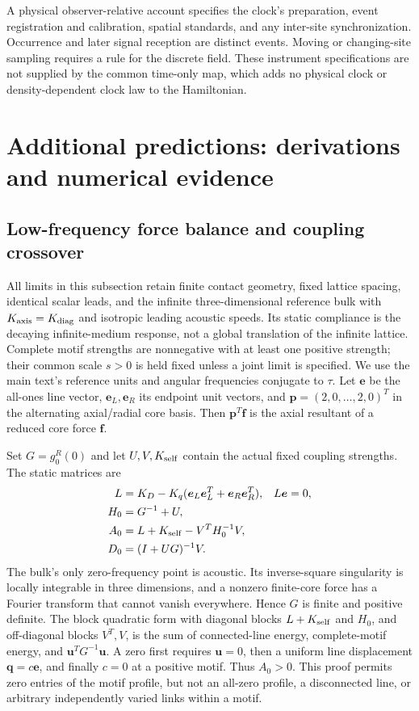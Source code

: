 \documentclass[10pt,aps,onecolumn,notitlepage,nofootinbib]{revtex4-2}
\newcommand{\vu}{\bm u}
\newcommand{\vf}{\bm f}
\begin{document}
A physical observer-relative account specifies the clock's preparation, event registration and calibration, spatial standards, and any inter-site synchronization. Occurrence and later signal reception are distinct events. Moving or changing-site sampling requires a rule for the discrete field. These instrument specifications are not supplied by the common time-only map, which adds no physical clock or density-dependent clock law to the Hamiltonian.

\clearpage
\section{Additional predictions: derivations and numerical evidence}
\label{pred:sm-sec-predictions}

\subsection{Low-frequency force balance and coupling crossover}
\label{pred:sm-sec-lowfreq}

All limits in this subsection retain finite contact geometry, fixed lattice spacing, identical scalar leads, and the infinite three-dimensional reference bulk with $K_{\rm axis}=K_{\rm diag}$ and isotropic leading acoustic speeds. Its static compliance is the decaying infinite-medium response, not a global translation of the infinite lattice. Complete motif strengths are nonnegative with at least one positive strength; their common scale $s>0$ is held fixed unless a joint limit is specified. We use the main text's reference units and angular frequencies conjugate to $\tau$. Let $\bm e$ be the all-ones line vector, $\bm e_L,\bm e_R$ its endpoint unit vectors, and $\bm p=(2,0,\ldots,2,0)^T$ in the alternating axial/radial core basis. Then $\bm p^T\vf$ is the axial resultant of a reduced core force $\vf$.

Set $G=g_0^R(0)$ and let $U,V,K_{\rm self}$ contain the actual fixed coupling strengths. The static matrices are
\begin{align}
 L&=K_D-K_q(\bm e_L\bm e_L^T+\bm e_R\bm e_R^T),
 &L\bm e&=0,\nonumber\\
 H_0&=G^{-1}+U,\nonumber\\
 A_0&=L+K_{\rm self}-V^TH_0^{-1}V,\nonumber\\
 D_0&=(I+UG)^{-1}V.
 \label{pred:sm-eq-static}
\end{align}
The bulk's only zero-frequency point is acoustic. Its inverse-square singularity is locally integrable in three dimensions, and a nonzero finite-core force has a Fourier transform that cannot vanish everywhere. Hence $G$ is finite and positive definite. The block quadratic form with diagonal blocks $L+K_{\rm self}$ and $H_0$, and off-diagonal blocks $V^T,V$, is the sum of connected-line energy, complete-motif energy, and $\vu^TG^{-1}\vu$. A zero first requires $\vu=0$, then a uniform line displacement $\bm q=c\bm e$, and finally $c=0$ at a positive motif. Thus $A_0>0$. This proof permits zero entries of the motif profile, but not an all-zero profile, a disconnected line, or arbitrary independently varied links within a motif.
\end{document}

